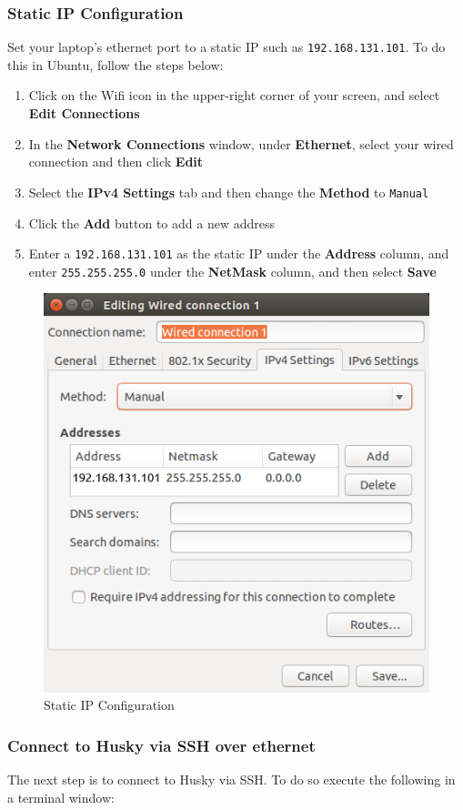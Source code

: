 \documentclass[]{clearpath-latex/clearpath-manual}
\begin{document}
\subsubsection{Static IP Configuration}

Set your laptop's ethernet port to a static IP such as \lstinline{192.168.131.101}.  To do this in Ubuntu, follow the steps below:
\begin{enumerate}
  \item Click on the Wifi icon in the upper-right corner of your screen, and select \textbf{Edit Connections}
  \item In the \textbf{Network Connections} window, under \textbf{Ethernet}, select your wired connection and then click \textbf{Edit}
  \item Select the \textbf{IPv4 Settings} tab and then change the \textbf{Method} to \lstinline{Manual}
  \item Click the \textbf{Add} button to add a new address
  \item Enter a \lstinline{192.168.131.101} as the static IP under the \textbf{Address} column, and enter \lstinline{255.255.255.0} under the \textbf{NetMask} column, and then select \textbf{Save}
\end{enumerate}

\begin{figure}[h]
  \centering
  \includegraphics[width=0.5\linewidth]{wired_connection.png}
  \caption{Static IP Configuration}
  \label{staticip}
\end{figure}

\subsubsection{Connect to Husky via SSH over ethernet}

The next step is to connect to Husky via SSH.  To do so execute the following in a terminal window:
\end{document}
